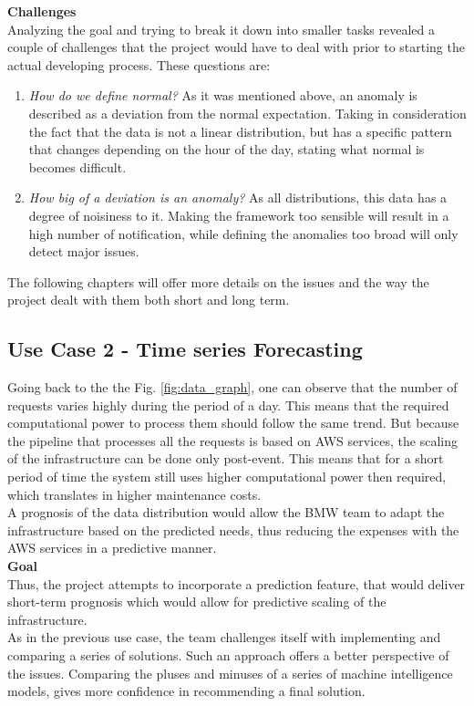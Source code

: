 \textbf{Challenges}\\
    Analyzing the goal and trying to break it down into smaller tasks revealed a couple of challenges that the project would have to deal with prior to starting the actual developing process. These questions are:
\begin{enumerate}
 	\item\emph{How do we define normal?} As it was mentioned above, an anomaly is described as a deviation from the normal expectation. Taking in consideration the fact that the data is not a linear distribution, but has a specific pattern that changes depending on the hour of the day, stating what normal is becomes difficult.
	\item\emph{How big of a deviation is an anomaly?} As all distributions, this data has a degree of noisiness to it. Making the framework too sensible will result in a high number of notification, while defining the anomalies too broad will only detect major issues.
\end{enumerate}
    The following chapters will offer more details on the issues and the way the project dealt with them both short  and long term.\\
    
\subsection{Use Case 2 - Time series Forecasting}
    \label{sec:use_case2}
    Going back to the the Fig. \ref{fig:data_graph}, one can observe that the number of requests varies highly during the period of a day. This means that the required computational power to process them should follow the same trend. But because the pipeline that processes all the requests is based on AWS services, the scaling of the infrastructure can be done only post-event. This means that for a short period of time the system still uses higher computational power then required, which translates in higher maintenance costs.\\
    A prognosis of the data distribution would allow the BMW team to adapt the infrastructure based on the predicted needs, thus reducing the expenses with the AWS services in a predictive manner.\\
    
    \textbf{Goal}\\
    Thus, the project attempts to incorporate a prediction feature, that would deliver short-term prognosis which would allow for predictive scaling of the infrastructure.\\
    As in the previous use case, the team challenges itself with implementing and comparing a series of solutions. Such an approach offers a better perspective of the issues. Comparing the pluses and minuses of a series of machine intelligence models, gives more confidence in recommending a final solution.\\ 
    
